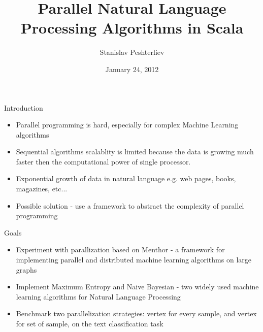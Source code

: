 \documentclass{beamer}
\title[Parallel Natural Language Processing Algorithms in Scala]{Parallel Natural Language Processing Algorithms in Scala}
\author{Stanislav Peshterliev}
\institute{EPFL}
\date{January 24, 2012}
\begin{document}
\begin{frame}
\titlepage
\end{frame}

\begin{frame}{Introduction}

\begin{itemize}
 \item Parallel programming is hard, especially for complex Machine Learning algorithms 
 \item Sequential algorithms scalablity is limited because the data is growing much faster then the computational power of single processor.
 \item Exponential growth of data in natural language e.g. web pages, books, magazines, etc...
 \item Possible solution - use a framework to abstract the complexity of parallel programming
\end{itemize}

\end{frame}


\begin{frame}{Goals}

\begin{itemize}
 \item Experiment with parallization based on Menthor\citep{oai:infoscience.epfl.ch:165111} - a framework for implementing parallel and distributed machine learning algorithms on large graphs
 \item Implement Maximum Entropy\citep{berger_a1-etal:1996a} and Naive Bayesian\citep{Rennie03} - two widely used machine learning algorithms for Natural Language Processing
 \item Benchmark two parallelization strategies: vertex for every sample, and vertex for set of sample, on the text classification task
\end{itemize}

\end{frame}

\end{document}
